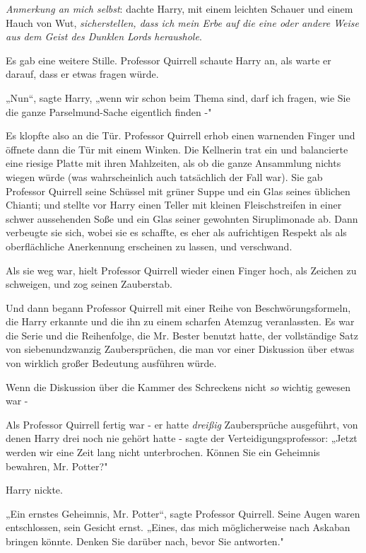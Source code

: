 {\emph{Anmerkung an mich selbst}: dachte Harry, mit einem leichten Schauer und einem Hauch von Wut, \emph{sicherstellen, dass ich mein Erbe auf die eine oder andere Weise aus dem Geist des Dunklen Lords heraushole}.

Es gab eine weitere Stille. Professor Quirrell schaute Harry an, als warte er darauf, dass er etwas fragen würde.

„Nun“, sagte Harry, „wenn wir schon beim Thema sind, darf ich fragen, wie Sie die ganze Parselmund-Sache eigentlich finden -"

Es klopfte also an die Tür. Professor Quirrell erhob einen warnenden Finger und öffnete dann die Tür mit einem Winken. Die Kellnerin trat ein und balancierte eine riesige Platte mit ihren Mahlzeiten, als ob die ganze Ansammlung nichts wiegen würde (was wahrscheinlich auch tatsächlich der Fall war). Sie gab Professor Quirrell seine Schüssel mit grüner Suppe und ein Glas seines üblichen Chianti; und stellte vor Harry einen Teller mit kleinen Fleischstreifen in einer schwer aussehenden Soße und ein Glas seiner gewohnten Siruplimonade ab. Dann verbeugte sie sich, wobei sie es schaffte, es eher als aufrichtigen Respekt als als oberflächliche Anerkennung erscheinen zu lassen, und verschwand.

Als sie weg war, hielt Professor Quirrell wieder einen Finger hoch, als Zeichen zu schweigen, und zog seinen Zauberstab.

Und dann begann Professor Quirrell mit einer Reihe von Beschwörungsformeln, die Harry erkannte und die ihn zu einem scharfen Atemzug veranlassten. Es war die Serie und die Reihenfolge, die Mr. Bester benutzt hatte, der vollständige Satz von siebenundzwanzig Zaubersprüchen, die man vor einer Diskussion über etwas von wirklich großer Bedeutung ausführen würde.

Wenn die Diskussion über die Kammer des Schreckens nicht \emph{so} wichtig gewesen war -

Als Professor Quirrell fertig war - er hatte \emph{dreißig} Zaubersprüche ausgeführt, von denen Harry drei noch nie gehört hatte - sagte der Verteidigungsprofessor: „Jetzt werden wir eine Zeit lang nicht unterbrochen. Können Sie ein Geheimnis bewahren, Mr. Potter?"

Harry nickte.

„Ein ernstes Geheimnis, Mr. Potter“, sagte Professor Quirrell. Seine Augen waren entschlossen, sein Gesicht ernst. „Eines, das mich möglicherweise nach Askaban bringen könnte. Denken Sie darüber nach, bevor Sie antworten."

}

